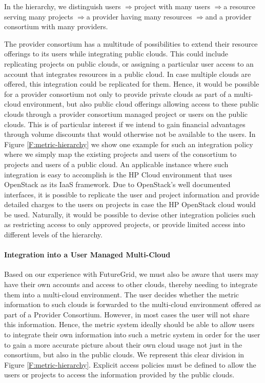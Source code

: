 \documentclass{tex/sig-alternate-2013}
\begin{document}
{\newcommand{\ARROW}{$\Rightarrow$}

In the hierarchy, we distinguish users \ARROW project with many users \ARROW a resource serving many projects \ARROW a provider having many resources \ARROW and a provider consortium with many providers.

The provider consortium has a multitude of possibilities to extend their resource offerings to its users while integrating public clouds. This could include replicating projects on public clouds, or assigning a particular user access to an account that integrates resources in a public cloud. In case multiple clouds are offered, this integration could be replicated for them. Hence, it would be possible for a provider consortium not only to provide private clouds as part of a multi-cloud environment, but also public cloud offerings allowing access to these public clouds through a provider consortium managed project or users on the public clouds. This is of particular interest if we intend to gain financial advantages through volume discounts that would otherwise not be available to the users.  In Figure \ref{F:metric-hierarchy} we show one example for such an integration policy where we simply map the existing projects and users of the consortium to projects and users of a public cloud. An applicable instance where such integration is easy to accomplish is the HP Cloud environment that uses OpenStack as its IaaS framework. Due to OpenStack’s well documented interfaces, it is possible to replicate the user and project information and provide detailed charges to the users on projects in case the HP OpenStack cloud would be used. Naturally, it would be possible to devise other integration policies such as restricting access to only approved projects, or provide limited access into different levels of the hierarchy.


\paragraph{Integration into a User Managed Multi-Cloud}

Based on our experience with FutureGrid, we must also be aware that users may have their own accounts and access to other clouds, thereby needing to integrate them into a multi-cloud environment. The user decides whether the metric information to such clouds is forwarded to the multi-cloud environment offered as part of a Provider Consortium. However, in most cases the user will not share this information. Hence, the metric system ideally should be able to allow users to integrate their own information into such a metric system in order for the user to gain a more accurate picture about their own cloud usage not just in the consortium, but also in the public clouds. We represent this clear division in Figure \ref{F:metric-hierarchy}. Explicit access policies must be defined to allow the users or projects to access the information provided by the public clouds.

}
\end{document}
